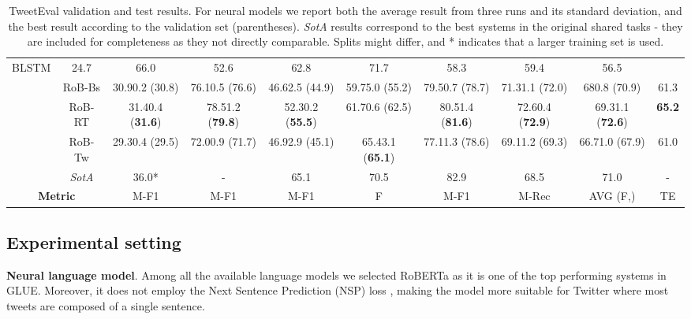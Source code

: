 \documentclass[11pt,a4paper]{article}
\begin{document}
\begin{table*}
{\begin{tabular}{cc|c|c|c|c|c|c|c||c}
  BLSTM &
  24.7 &
  66.0 &
  52.6 &
  62.8 &
  71.7 &
  58.3 &
  59.4 &
  56.5  \\
\multicolumn{1}{c|}{} &
  RoB-Bs &
  30.9{\small 0.2} (30.8) &
  76.1{\small 0.5} (76.6) &
  46.6{\small 2.5} (44.9) &
  59.7{\small 5.0} (55.2) &
  79.5{\small 0.7} (78.7) &
  71.3{\small 1.1} (72.0) &
  68{\small 0.8} (70.9) &
  61.3 \\
\multicolumn{1}{c|}{} &
  RoB-RT &
  31.4{\small 0.4} (\textbf{31.6}) &
  78.5{\small 1.2} (\textbf{79.8}) &
  52.3{\small 0.2} (\textbf{55.5}) &
  61.7{\small 0.6} (62.5) &
  80.5{\small 1.4} (\textbf{81.6}) &
  72.6{\small 0.4} (\textbf{72.9}) &
  69.3{\small 1.1} (\textbf{72.6}) &
  \textbf{65.2} \\
\multicolumn{1}{c|}{} &
  RoB-Tw &
  29.3{\small 0.4} (29.5) &
  72.0{\small 0.9} (71.7) &
  46.9{\small 2.9} (45.1) &
  65.4{\small 3.1} (\textbf{65.1}) &
  77.1{\small 1.3} (78.6) &
  69.1{\small 1.2} (69.3) &
  66.7{\small 1.0} (67.9) &
  61.0 \\ \cline{2-10} 
\multicolumn{1}{c|}{} &
  \textit{SotA} &
  36.0* &
  - &
  65.1 &
  70.5 &
  82.9 &
  68.5 &
  71.0 &
  - \\ \hline \hline
\multicolumn{2}{c|}{\textbf{Metric}} &
  M-F1 &
  M-F1 &
  M-F1 &
  F &
  M-F1 &
  M-Rec &
  AVG (F,) & TE
   \\ \bottomrule
\end{tabular}
}
\caption{\label{table-results} TweetEval validation and test results. For neural models we report both the average result from three runs and its standard deviation, and the best result according to the validation set (parentheses). \textit{SotA} results correspond to the best systems in the original shared tasks - they are included for completeness as they not directly comparable.  Splits might differ, and * indicates that a larger training set is used.}
\end{table*}


\subsection{Experimental setting}

\textbf{Neural language model}.
Among all the available language models we selected RoBERTa \cite{liu2019roberta} as it is one of the top performing systems in GLUE. Moreover, it does not employ the Next Sentence Prediction (NSP) loss \cite{devlin2018bert}, making the model more suitable for Twitter where most tweets are composed of a single sentence. 
\end{document}
